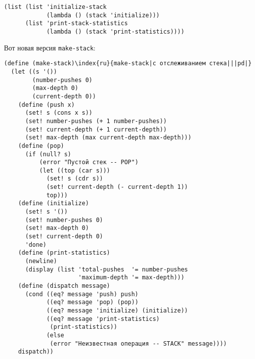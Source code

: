 \begin{Verbatim}[fontsize=\small]
(list (list 'initialize-stack
            (lambda () (stack 'initialize)))
      (list 'print-stack-statistics
            (lambda () (stack 'print-statistics))))
\end{Verbatim}
Вот новая версия {\tt make-stack}:

\begin{Verbatim}[fontsize=\small]
(define (make-stack)\index{ru}{make-stack|с отслеживанием стека|||pd|}
  (let ((s '())
        (number-pushes 0)
        (max-depth 0)
        (current-depth 0))
    (define (push x)
      (set! s (cons x s))
      (set! number-pushes (+ 1 number-pushes))
      (set! current-depth (+ 1 current-depth))
      (set! max-depth (max current-depth max-depth)))
    (define (pop)
      (if (null? s)
          (error "Пустой стек -- POP")
          (let ((top (car s)))
            (set! s (cdr s))
            (set! current-depth (- current-depth 1))
            top)))    
    (define (initialize)
      (set! s '())
      (set! number-pushes 0)
      (set! max-depth 0)
      (set! current-depth 0)
      'done)
    (define (print-statistics)
      (newline)
      (display (list 'total-pushes  '= number-pushes
                     'maximum-depth '= max-depth)))
    (define (dispatch message)
      (cond ((eq? message 'push) push)
            ((eq? message 'pop) (pop))
            ((eq? message 'initialize) (initialize))
            ((eq? message 'print-statistics)
             (print-statistics))
            (else
             (error "Неизвестная операция -- STACK" message))))
    dispatch))
\end{Verbatim}


